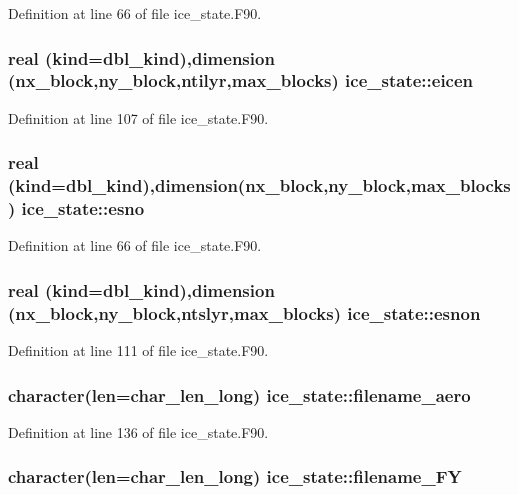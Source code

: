 Definition at line 66 of file ice\_\-state.F90.\hypertarget{namespaceice__state_ae98b075caabb73fcd86ce51eb76849b4}{
\subsubsection[{eicen}]{\setlength{\rightskip}{0pt plus 5cm}real (kind=dbl\_\-kind),dimension (nx\_\-block,ny\_\-block,ntilyr,max\_\-blocks) {\bf ice\_\-state::eicen}}}
\label{namespaceice__state_ae98b075caabb73fcd86ce51eb76849b4}


Definition at line 107 of file ice\_\-state.F90.\hypertarget{namespaceice__state_af4c38f6f98fdc5516cde3066120a0074}{
\subsubsection[{esno}]{\setlength{\rightskip}{0pt plus 5cm}real (kind=dbl\_\-kind),dimension(nx\_\-block,ny\_\-block,max\_\-blocks) {\bf ice\_\-state::esno}}}
\label{namespaceice__state_af4c38f6f98fdc5516cde3066120a0074}


Definition at line 66 of file ice\_\-state.F90.\hypertarget{namespaceice__state_aeb23ce1b6f981d016e447371d318a10c}{
\subsubsection[{esnon}]{\setlength{\rightskip}{0pt plus 5cm}real (kind=dbl\_\-kind),dimension (nx\_\-block,ny\_\-block,ntslyr,max\_\-blocks) {\bf ice\_\-state::esnon}}}
\label{namespaceice__state_aeb23ce1b6f981d016e447371d318a10c}


Definition at line 111 of file ice\_\-state.F90.\hypertarget{namespaceice__state_ab5f78ad535732539802475cc958d8bc0}{
\subsubsection[{filename\_\-aero}]{\setlength{\rightskip}{0pt plus 5cm}character(len=char\_\-len\_\-long) {\bf ice\_\-state::filename\_\-aero}}}
\label{namespaceice__state_ab5f78ad535732539802475cc958d8bc0}


Definition at line 136 of file ice\_\-state.F90.\hypertarget{namespaceice__state_ab81811ccfe7c4d81a224263818d7622a}{
\subsubsection[{filename\_\-FY}]{\setlength{\rightskip}{0pt plus 5cm}character(len=char\_\-len\_\-long) {\bf ice\_\-state::filename\_\-FY}}}
\label{namespaceice__state_ab81811ccfe7c4d81a224263818d7622a}


